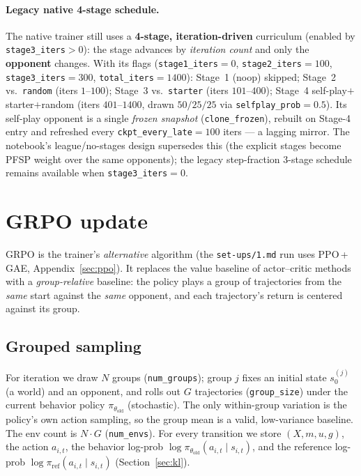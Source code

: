 \documentclass[11pt]{article}
\newcommand{\polold}{\pi_{\theta_{\mathrm{old}}}}
\newcommand{\polref}{\pi_{\mathrm{ref}}}
\begin{document}
\paragraph{Legacy native 4-stage schedule.} The native trainer still uses a \textbf{4-stage,
iteration-driven} curriculum (enabled by \texttt{stage3\_iters}$>0$): the stage advances by
\emph{iteration count} and only the \textbf{opponent} changes. With its flags (\texttt{stage1\_iters}$=0$,
\texttt{stage2\_iters}$=100$, \texttt{stage3\_iters}$=300$, \texttt{total\_iters}$=1400$): Stage~1 (noop)
skipped; Stage~2 vs.\ \texttt{random} (iters $1$--$100$); Stage~3 vs.\ \texttt{starter} (iters
$101$--$400$); Stage~4 self-play$+$starter$+$random (iters $401$--$1400$, drawn $50/25/25$ via
\texttt{selfplay\_prob}$=0.5$). Its self-play opponent is a single \emph{frozen snapshot}
(\texttt{clone\_frozen}), rebuilt on Stage-4 entry and refreshed every \texttt{ckpt\_every\_late}$=100$
iters --- a lagging mirror. The notebook's league/no-stages design supersedes this (the explicit stages
become PFSP weight over the same opponents); the legacy step-fraction $3$-stage schedule remains
available when \texttt{stage3\_iters}$=0$.

\section{GRPO update}\label{sec:grpo}
GRPO is the trainer's \emph{alternative} algorithm (the \texttt{set-ups/1.md} run uses PPO\,+\,GAE,
Appendix~\ref{sec:ppo}). It replaces the value baseline of actor--critic methods with a
\emph{group-relative} baseline: the policy plays a group of trajectories from the \emph{same} start
against the \emph{same} opponent, and each trajectory's return is centered against its group.

\subsection{Grouped sampling}
For iteration we draw $N$ groups (\texttt{num\_groups}); group $j$ fixes an initial state
$s_0^{(j)}$ (a world) and an opponent, and rolls out $G$ trajectories (\texttt{group\_size})
under the current behavior policy $\polold$ (stochastic). The only within-group variation is
the policy's own action sampling, so the group mean is a valid, low-variance baseline. The
env count is $N\cdot G$ (\texttt{num\_envs}). For every transition we store
$(X,m,u,g)$, the action $a_{i,t}$, the behavior log-prob $\log\polold(a_{i,t}\mid s_{i,t})$,
and the reference log-prob $\log\polref(a_{i,t}\mid s_{i,t})$ (Section~\ref{sec:kl}).
\end{document}
